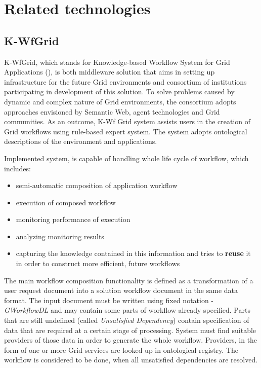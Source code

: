 
\section{Related technologies} 

\subsection{K-WfGrid}

\label{ssec:kwfgrid}

K-WfGrid, which stands for Knowledge-based Workflow System for Grid Applications (\cite{KWfGrid1, flow-cgw04, wct-kwf-book-07}), is both middleware solution that aims in setting up infrastructure for the future Grid environments and consortium of institutions participating in development of this solution. To solve problems caused by dynamic and complex nature of Grid environments, the consortium adopts approaches envisioned by Semantic Web, agent technologies and Grid communities. As an outcome, K-Wf Grid system assists users in the creation of Grid workflows using rule-based expert system. The system adopts ontological descriptions of the environment and applications.

Implemented system, is capable of handling whole life cycle of workflow, which includes:

\begin{itemize}

\item{semi-automatic composition of application workflow} \item{execution of composed workflow} \item{monitoring performance of execution} \item{analyzing monitoring results} \item{capturing the knowledge contained in this information and tries to {\bf reuse} it in order to construct more efficient, future workflows} \end{itemize}

The main workflow composition functionality is defined as a transformation of a user request document into a solution workflow document in the same data format. The input document must be written using fixed notation - \emph{GWorkflowDL} and may contain some parts of workflow already specified. Parts that are still undefined (called \emph{Unsatisfied Dependency}) contain specification of data that are required at a certain stage of processing. System must find suitable providers of those data in order to generate the whole workflow. Providers, in the form of one or more Grid services are looked up in ontological registry. The workflow is considered to be done, when all unsatisfied dependencies are resolved.

